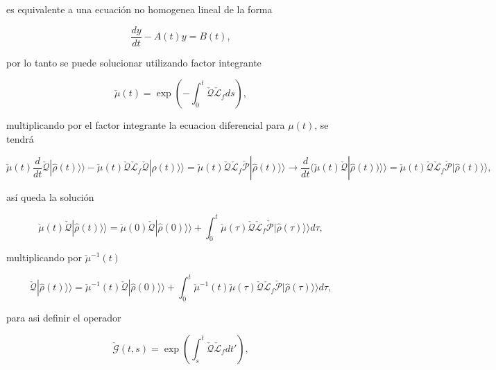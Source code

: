 \begin{appendixs}
es equivalente a una ecuación no homogenea lineal de la forma

\begin{equation*}
    \frac{dy}{dt} - A(t)y = B(t),
\end{equation*}

por lo tanto se puede solucionar utilizando factor integrante

\begin{equation*}
    \check{\mu}(t) = \exp\left( - \int_{0}^{t}\check{\mathcal{Q}}\check{\mathcal{L}}_{f}ds \right),
\end{equation*}

multiplicando por el factor integrante la ecuacion diferencial para $\mu(t)$, se tendrá

\begin{equation*}
    \check{\mu}(t)\frac{d}{dt}\check{\mathcal{Q}}|\hat{\rho}(t)\rangle \rangle - \check{\mu}(t)\check{\mathcal{Q}}\check{\mathcal{L}}_{f}\check{\mathcal{Q}}|\hat{\rho}(t)\rangle \rangle  = \check{\mu}(t)\check{\mathcal{Q}}\check{\mathcal{L}}_{f}\check{\mathcal{P}}|\hat{\rho}(t)\rangle \rangle  \to \frac{d}{dt}(\check{\mu}(t)\check{\mathcal{Q}}|\hat{\rho}(t))\rangle \rangle = \check{\mu}(t)\check{\mathcal{Q}}\check{\mathcal{L}}_{f}\check{\mathcal{P}}|\hat{\rho}(t)\rangle \rangle ,
\end{equation*}

así queda la solución

\begin{equation*}
    \check{\mu}(t)\check{\mathcal{Q}}|\hat{\rho}(t)\rangle \rangle  = \check{\mu}(0)\check{\mathcal{Q}}|\hat{\rho}(0)\rangle \rangle  + \int_{0}^{t}\check{\mu}(\tau)\check{\mathcal{Q}}\check{\mathcal{L}}_{f} \check{\mathcal{P}}|\hat{\rho}(\tau)\rangle \rangle d\tau,   
\end{equation*}

multiplicando por $\check{\mu}^{-1}(t)$ 

\begin{equation*}
    \check{\mathcal{Q}}|\hat{\rho}(t)\rangle \rangle  = \check{\mu}^{-1}(t)\check{\mathcal{Q}}|\hat{\rho}(0)\rangle \rangle  + \int_{0}^{t}\check{\mu}^{-1}(t)\check{\mu}(\tau)\check{\mathcal{Q}}\check{\mathcal{L}}_{f} \check{\mathcal{P}}|\hat{\rho}(\tau)\rangle \rangle d\tau,    
\end{equation*}

para asi definir el operador

\begin{equation*}
    \check{\mathcal{G}}(t,s) = \exp\left(  \int_{s}^{t}\check{\mathcal{Q}}\check{\mathcal{L}}_{f}dt' \right),
\end{equation*}


\end{appendixs}
